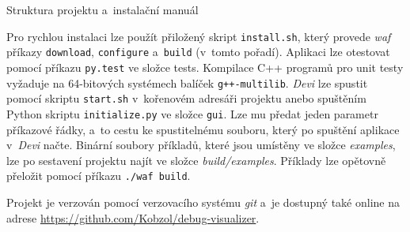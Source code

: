 \documentclass[czech,bachelor,male,python,dept460,hidelinks]{diploma}						%
\newcommand{\parspace}[1][]{
	\ifthenelse{\isempty{#1}}{\vspace{0mm}}{\vspace{#1}}
	\par
}
\begin{document}
\begin{section}{Struktura projektu a~instalační manuál}
	\parspace Pro rychlou instalaci lze použít přiložený skript \texttt{install.sh}, který provede \textit{waf} příkazy \texttt{download}, \texttt{configure}
	a~\texttt{build} (v~tomto pořadí).
	Aplikaci lze otestovat pomocí příkazu \texttt{py.test} ve složce tests. Kompilace C++ programů pro unit testy vyžaduje na 64-bitových systémech
	balíček \texttt{g++-multilib}.
	\textit{Devi} lze spustit pomocí skriptu \texttt{start.sh} v~kořenovém adresáři projektu anebo spuštěním Python skriptu \texttt{initialize.py}
	ve složce \texttt{gui}. Lze mu předat jeden parametr příkazové řádky, a~to cestu ke spustitelnému souboru, který po spuštění aplikace v~\textit{Devi} načte.
	Binární soubory příkladů, které jsou umístěny ve složce \textit{examples}, lze po sestavení projektu najít ve složce \textit{build/examples}.
	Příklady lze opětovně přeložit pomocí příkazu \texttt{./waf build}.
	
	\parspace Projekt je verzován pomocí verzovacího systému \textit{git} a~je dostupný také online na adrese \url{https://github.com/Kobzol/debug-visualizer}.
\end{section}

\clearpage
\end{document}
